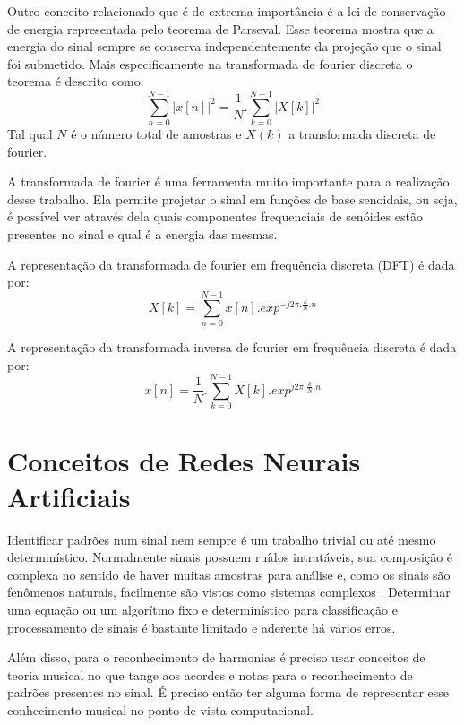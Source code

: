 Outro conceito relacionado que é de extrema importância é a lei de conservação de energia representada pelo teorema de Parseval. Esse teorema mostra que a energia do sinal sempre se conserva independentemente da projeção que o sinal foi submetido. Mais especificamente na transformada de fourier discreta o teorema é descrito como:
\begin{equation}
\label{eqn09}
	\sum_{n=0}^{N - 1}{|x[n]|^{2}} =  \frac{1}{N}.\sum_{k=0}^{N - 1}{|X[k]|^{2}}
\end{equation}
Tal qual $N$ é o número total de amostras e $X(k)$ a transformada discreta de fourier.

A transformada de fourier é uma ferramenta muito importante para a realização desse trabalho. Ela permite projetar o sinal em funções de base senoidais, ou seja, é possível ver através dela quais componentes frequenciais de senóides estão presentes no sinal e qual é a energia das mesmas.

A representação da transformada de fourier em frequência discreta (DFT) é dada por:
\begin{equation}
\label{eqn12}
	X[k] = \sum_{n=0}^{N - 1}{x[n].{exp}^{-j2\pi.\frac{k}{N}.n}}
\end{equation}

A representação da transformada inversa de fourier em frequência discreta é dada por:
\begin{equation}
\label{eqn13}
	x[n] = \frac{1}{N}.\sum_{k=0}^{N - 1}{X[k].{exp}^{j2\pi.\frac{k}{N}.n}}
\end{equation}


\section{Conceitos de Redes Neurais Artificiais}
\label{sec:conceitosredesneurais}

Identificar padrões num sinal nem sempre é um trabalho trivial ou até mesmo determinístico. Normalmente sinais possuem ruídos intratáveis, sua composição é complexa no sentido de haver muitas amostras para análise e, como os sinais são fenômenos naturais, facilmente são vistos como sistemas complexos \cite{morin}. Determinar uma equação ou um algorítmo fixo e determinístico para classificação e processamento de sinais é bastante limitado e aderente há vários erros.

Além disso, para o reconhecimento de harmonias é preciso usar conceitos de teoria musical no que tange aos acordes e notas para o reconhecimento de padrões presentes no sinal. É preciso então ter alguma forma de representar esse conhecimento musical no ponto de vista computacional.

